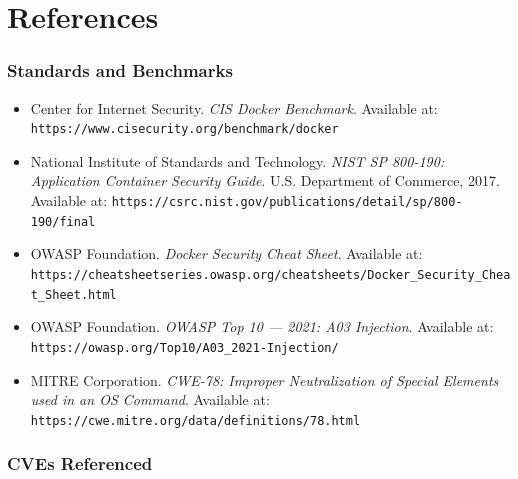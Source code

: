 
\chapter{References}

\subsection{Standards and Benchmarks}

\begin{itemize}

    \item Center for Internet Security.
    \textit{CIS Docker Benchmark}.
    Available at: \texttt{https://www.cisecurity.org/benchmark/docker}

    \item National Institute of Standards and Technology.
    \textit{NIST SP 800-190: Application Container Security Guide}.
    U.S. Department of Commerce, 2017.
    Available at: \texttt{https://csrc.nist.gov/publications/detail/sp/800-190/final}

    \item OWASP Foundation.
    \textit{Docker Security Cheat Sheet}.
    Available at:
    \texttt{https://cheatsheetseries.owasp.org/cheatsheets/Docker\_Security\_Cheat\_Sheet.html}

    \item OWASP Foundation.
    \textit{OWASP Top 10 --- 2021: A03 Injection}.
    Available at: \texttt{https://owasp.org/Top10/A03\_2021-Injection/}

    \item MITRE Corporation.
    \textit{CWE-78: Improper Neutralization of Special Elements
    used in an OS Command}.
    Available at: \texttt{https://cwe.mitre.org/data/definitions/78.html}

\end{itemize}

\subsection{CVEs Referenced}

